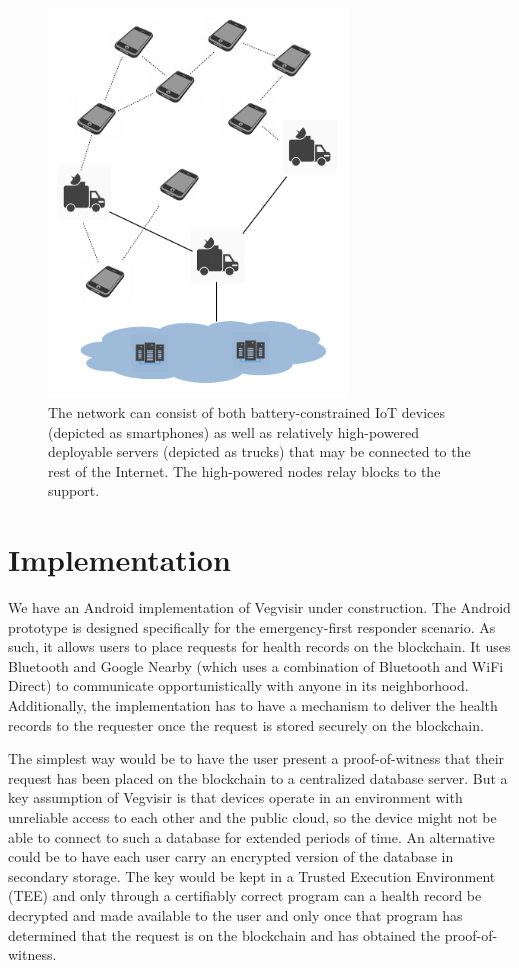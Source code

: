 \documentclass[conference, letterpaper]{IEEEtran}
\begin{document}
\begin{figure}
\centering
\includegraphics[width=8cm]{superpeers}
\caption{The network can consist of both battery-constrained IoT devices (depicted as smartphones) as well as relatively high-powered deployable servers (depicted as trucks) that may be connected to the rest of the Internet. The high-powered nodes relay blocks to the support.}
\end{figure}

\section{Implementation}
\label{sec:implementation}

We have an Android implementation of Vegvisir under construction. The Android prototype is designed specifically for the emergency-first responder scenario. As such, it allows users to place requests for health records on the blockchain. It uses Bluetooth and Google Nearby (which uses a combination of Bluetooth and WiFi Direct) to communicate opportunistically with anyone in its neighborhood. Additionally, the implementation has to have a mechanism to deliver the health records to the requester once the request is stored securely on the blockchain. 

The simplest way would be to have the user present a proof-of-witness that their request has been placed on the blockchain to a centralized database server. But a key assumption of Vegvisir is that devices operate in an environment with unreliable access to each other and the public cloud, so the device might not be able to connect to such a database for extended periods of time. An alternative could be to have each user carry an encrypted version of the database in secondary storage. The key would be kept in a Trusted Execution Environment (TEE) and only through a certifiably correct program can a health record be decrypted and made available to the user and only once that program has determined that the request is on the blockchain and has obtained the proof-of-witness.
\end{document}
